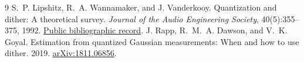 \documentclass[10pt,a4paper]{article}
\begin{document}
\begin{thebibliography}{9}
S.~P. Lipshitz, R.~A. Wannamaker, and J. Vanderkooy.
Quantization and dither: A theoretical survey.
\emph{Journal of the Audio Engineering Society}, 40(5):355--375, 1992.
\href{https://aes.org/publications/elibrary/elibrary-page/?id=7047}{Public bibliographic record}.
J. Rapp, R.~M.~A. Dawson, and V.~K. Goyal.
Estimation from quantized Gaussian measurements: When and how to use dither.
2019. \href{https://arxiv.org/abs/1811.06856}{arXiv:1811.06856}.
\end{thebibliography}
\end{document}
